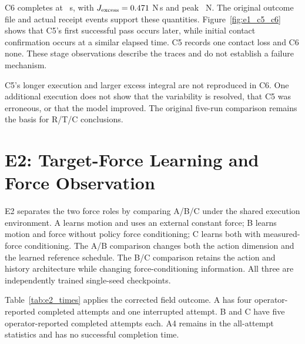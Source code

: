 \begin{table}[tbp]\centering\footnotesize
\caption[Original C5 and additional diagnostic C6]{Individual E1 executions with the same recorded evaluator. C5 belongs to the original primary five; C6 is additional diagnostic evidence. Times are relative to each execution start. Single-run values are shown without mean or SD.}
\label{tab:e1_c5_c6}
\end{table}

C6 completes at \CsixTime~s, with \(J_{\mathrm{excess}}=0.471\) N\,s and peak \CsixPeak~N. The original outcome file and actual receipt events support these quantities. Figure~\ref{fig:e1_c5_c6} shows that C5's first successful pass occurs later, while initial contact confirmation occurs at a similar elapsed time. C5 records one contact loss and C6 none. These stage observations describe the traces and do not establish a failure mechanism.


C5's longer execution and larger excess integral are not reproduced in C6. One additional execution does not show that the variability is resolved, that C5 was erroneous, or that the model improved. The original five-run comparison remains the basis for R/T/C conclusions.

\section{E2: Target-Force Learning and Force Observation}
E2 separates the two force roles by comparing A/B/C under the shared execution environment. A learns motion and uses an external constant force; B learns motion and force without policy force conditioning; C learns both with measured-force conditioning. The A/B comparison changes both the action dimension and the learned reference schedule. The B/C comparison retains the action and history architecture while changing force-conditioning information. All three are independently trained single-seed checkpoints.

Table~\ref{tab:e2_times} applies the corrected field outcome. A has four operator-reported completed attempts and one interrupted attempt. B and C have five operator-reported completed attempts each. A4 remains in the all-attempt statistics and has no successful completion time.

